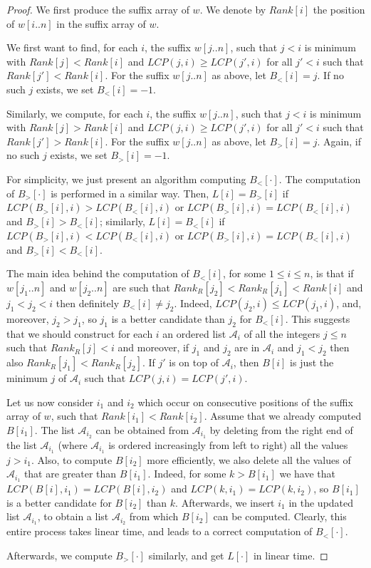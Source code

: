 \documentclass[final]{dmtcs-episciences}
\newcommand{\LCP}{{\mathit{LCP}}}
\begin{document}
\begin{proof}
We first produce the suffix array of $w$. We denote by $Rank[i]$ the position of $w[i..n]$ in the suffix array of $w$. 

We first want to find, for each $i$, the suffix $w[j..n]$, such that $j<i$ is minimum with $Rank[j]<Rank[i]$ and $\LCP(j,i)\geq \LCP(j',i)$ for all $j'<i$ such that $Rank[j']<Rank[i]$.
For the suffix $w[j..n]$ as above, let $B_<[i]=j$. If no such $j$ exists, we set $B_<[i]=-1$. 

Similarly, we compute, for each $i$, the suffix $w[j..n]$, such that $j<i$ is minimum with $Rank[j]>Rank[i]$ and $\LCP(j,i)\geq \LCP(j',i)$ for all $j'<i$ such that $Rank[j']>Rank[i]$.
For the suffix $w[j..n]$ as above, let $B_>[i]=j$. Again, if no such $j$ exists, we set $B_>[i]=-1$.  

For simplicity, we just present an algorithm computing $B_<[\cdot]$. The computation of $B_>[\cdot]$ is performed in a similar way. Then, $L[i]=B_>[i]$ if $\LCP(B_>[i],i)>\LCP(B_<[i],i)$ or $\LCP(B_>[i],i)=\LCP(B_<[i],i)$ and $B_>[i]>B_<[i]$; similarly, $L[i]=B_<[i]$ if $\LCP(B_>[i],i)<\LCP(B_<[i],i)$ or $\LCP(B_>[i],i)=\LCP(B_<[i],i)$ and $B_>[i]<B_<[i]$.

The main idea behind the computation of $ B_<[i]$, for some $1\leq i\leq n$, is that if $w[j_1..n]$ and $w[j_2..n]$ are such that $Rank_R[j_2]<Rank_R[j_1]<Rank[i]$ and $j_1<j_2<i$ then definitely $B_<[i]\neq j_2$. Indeed, $\LCP(j_2,i)\leq \LCP(j_1,i)$, and, moreover, $j_2>j_1$, so $j_1$ is a better candidate than $j_2$ for $B_<[i]$. This suggests that we should construct for each $i$ an ordered list ${\mathcal A}_i$ of all the integers $j\leq n$ such that $Rank_R[j]<i$ and moreover, if $j_1$ and $j_2$ are in ${\mathcal A}_i$ and $j_1<j_2$ then also $Rank_R[j_1]<Rank_R[j_2]$. If $j'$ is on top of ${\mathcal A}_i$, then $B[i]$ is just the minimum $j$ of ${\mathcal A}_i$ such that $\LCP(j,i)=\LCP(j',i)$.

Let us now consider $i_1$ and $i_2$ which occur on consecutive positions of the suffix array of $w$, such that $Rank[i_1]<Rank[i_2]$. Assume that we already computed $B[i_1]$. The list ${\mathcal A}_{i_2}$ can be obtained from ${\mathcal A}_{i_1}$ by deleting from the right end of the list ${\mathcal A}_{i_1}$ (where ${\mathcal A}_{i_1}$ is ordered increasingly from left to right) all the values $j>i_1$. Also, to compute $B[i_2]$ more efficiently, we also delete all the values of ${\mathcal A}_{i_1}$ that are greater than $B[i_1]$. Indeed, for some $k>B[i_1]$ we have that $\LCP(B[i],i_1)=\LCP(B[i],i_2)$ and $\LCP(k,i_1)=\LCP(k,i_2)$, so $B[i_1]$ is a better candidate for $B[i_2]$ than $k$. Afterwards, we insert $i_1$ in the updated list ${\mathcal A}_{i_1}$, to obtain a list ${\mathcal A}_{i_2}$ from which $B[i_2]$ can be computed. Clearly, this entire process takes linear time, and leads to a correct computation of $B_<[\cdot]$. 

Afterwards, we compute $B_>[\cdot]$ similarly, and get $L[\cdot]$ in linear time.
\end{proof}
\end{document}

